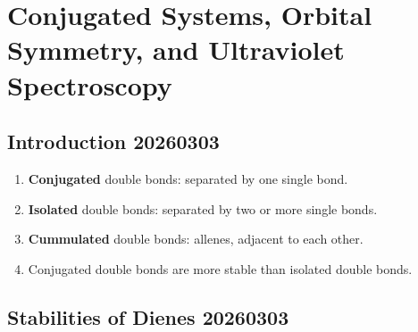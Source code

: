 \section{Conjugated Systems, Orbital Symmetry, and Ultraviolet Spectroscopy}

\subsection{Introduction 20260303}

\begin{enumerate}
    \item \textbf{Conjugated} double bonds: separated by one single bond.
    \item \textbf{Isolated} double bonds: separated by two or more single bonds.
    \item \textbf{Cummulated} double bonds: allenes, adjacent to each other.
    \item Conjugated double bonds are more stable than isolated double bonds.
\end{enumerate}

\subsection{Stabilities of Dienes 20260303}

